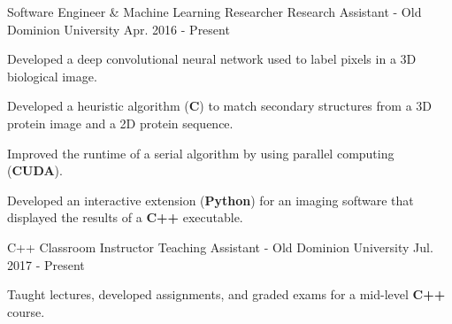 \begin{cventries}
  \cventry
    {Software Engineer \& Machine Learning Researcher}
    {Research Assistant - Old Dominion University}
    {Apr. 2016 - Present}
    {}
    {
      \begin{cvitems}
        \item {Developed a deep convolutional neural network used to label pixels in a 3D biological
image.}
        \item {Developed a heuristic algorithm (\textbf{C}) to match secondary structures from a 3D protein
image and a 2D protein sequence.}
        \item {Improved the runtime of a serial algorithm by using parallel computing (\textbf{CUDA}).}
        \item {Developed an interactive extension (\textbf{Python}) for an imaging software that displayed the results of a \textbf{C++} executable.}
      \end{cvitems}
    }
  \cventry
    {C++ Classroom Instructor}
    {Teaching Assistant - Old Dominion University}
    {Jul. 2017 - Present}
    {}
    {
      \begin{cvitems}
        \item {Taught lectures, developed assignments, and graded exams for a mid-level \textbf{C++} course.}
      \end{cvitems}
    }
\end{cventries}
